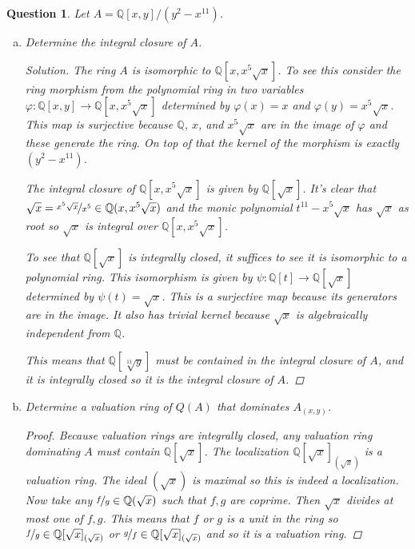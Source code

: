 \documentclass{article}
\newcommand{\Q}{\mathbb{Q}}
\newenvironment{solution}{\begin{proof}[Solution]\renewcommand\qedsymbol{}}{\end{proof}}
\newtheorem{question}{Question}
\theoremstyle{definition}
\begin{document}
\begin{question}
    Let \(A=\Q[x,y]/(y^{2}-x^{11})\).
    \begin{enumerate}[(a)]
        \item Determine the integral closure of \(A\).

              \begin{solution}
                  The ring \(A\) is isomorphic to \(\Q[x,x^{5}\sqrt{x}]\). To
                  see this consider the ring morphism from the polynomial ring
                  in two variables \(\varphi:\Q[x,y]\to\Q[x,x^{5}\sqrt{x}]\)
                  determined by \(\varphi(x)=x\) and
                  \(\varphi(y)=x^{5}\sqrt{x}\). This map is surjective because
                  \(\Q\), \(x\), and \(x^{5}\sqrt{x}\) are in the image of
                  \(\varphi\) and these generate the ring. On top of that the
                  kernel of the morphism is exactly \((y^{2}-x^{11})\).

                  The integral closure of \(\Q[x,x^{5}\sqrt{x}]\) is given by
                  \(\Q[\sqrt{x}]\). It's clear that
                  \(\sqrt{x}=\nicefrac{x^{5}\sqrt{x}}{x^{5}}\in\Q(x,x^{5}\sqrt{x})\)
                  and the monic polynomial \(t^{11}-x^{5}\sqrt{x}\) has
                  \(\sqrt{x}\) as root so \(\sqrt{x}\) is integral over
                  \(\Q[x,x^{5}\sqrt{x}]\).

                  To see that \(\Q[\sqrt{x}]\) is integrally closed, it suffices
                  to see it is isomorphic to a polynomial ring. This isomorphism
                  is given by \(\psi:\Q[t]\to\Q[\sqrt{x}]\) determined by
                  \(\psi(t)=\sqrt{x}\). This is a surjective map because its
                  generators are in the image. It also has trivial kernel
                  because \(\sqrt{x}\) is algebraically independent from \(\Q\).

                  This means that \(\Q[\sqrt[11]{y}]\) must be contained in the
                  integral closure of \(A\), and it is integrally closed so it
                  is the integral closure of \(A\).
              \end{solution}

        \item Determine a valuation ring of \(Q(A)\) that dominates
              \(A_{(x,y)}\).

              \begin{proof}
                  Because valuation rings are integrally closed, any valuation
                  ring dominating \(A\) must contain \(\Q[\sqrt{x}]\). The
                  localization \(\Q[\sqrt{x}]_{(\sqrt{x})}\) is a valuation
                  ring. The ideal \((\sqrt{x})\) is maximal so this is indeed a
                  localization. Now take any \(\nicefrac{f}{g}\in\Q(\sqrt{x})\)
                  such that \(f,g\) are coprime. Then \(\sqrt{x}\) divides at
                  most one of \(f,g\). This means that \(f\) or \(g\) is a unit
                  in the ring so \(\nicefrac{f}{g}\in\Q[\sqrt{x}]_{(\sqrt{x})}\)
                  or \(\nicefrac{g}{f}\in \Q[\sqrt{x}]_{(\sqrt{x})}\) and so it
                  is a valuation ring.


\end{proof}
\end{enumerate}
\end{question}
\end{document}
